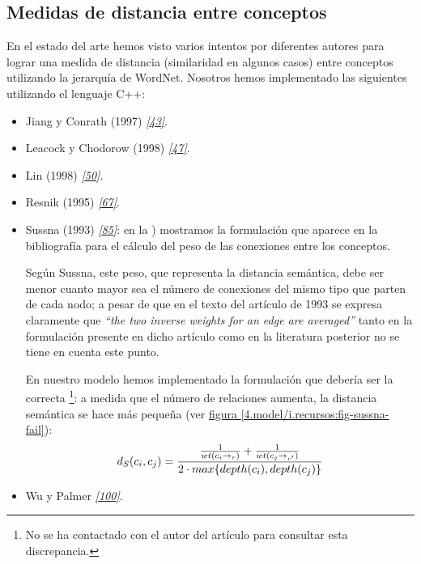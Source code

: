 \documentclass[a4paper,12pt,spanish]{book}
\begin{document}
\subsection{Medidas de distancia entre conceptos}
\label{4.model/i.recursos:medidas-de-distancia-entre-conceptos}
En el estado del arte hemos visto varios intentos por diferentes autores para lograr una
medida de distancia (similaridad en algunos casos) entre conceptos utilizando la jerarquía de
WordNet. Nosotros hemos implementado las siguientes utilizando el lenguaje C++:
\begin{itemize}
\item {} 
Jiang y Conrath (1997) \label{4.model/i.recursos:id7}{\hyperref[zreferences:jiang1997]{\emph{{[}43{]}}}}.

\item {} 
Leacock y Chodorow (1998) \label{4.model/i.recursos:id8}{\hyperref[zreferences:leacock1998]{\emph{{[}47{]}}}}.

\item {} 
Lin (1998) \label{4.model/i.recursos:id9}{\hyperref[zreferences:lin1998]{\emph{{[}50{]}}}}.

\item {} 
Resnik (1995) \label{4.model/i.recursos:id10}{\hyperref[zreferences:resnik1995]{\emph{{[}67{]}}}}.

\item {} 
Sussna (1993) \label{4.model/i.recursos:id11}{\hyperref[zreferences:sussna1993]{\emph{{[}85{]}}}}: en la {\hyperref[1.state-of-the-art/ii.medidas-distancia:redes-conceptos-estructura]{\emph{}}})
mostramos la formulación que aparece en la bibliografía para el cálculo del peso
de las conexiones entre los conceptos.

Según Sussna, este peso, que representa la distancia semántica, debe ser menor
cuanto mayor sea el número de conexiones del mismo tipo que parten de cada nodo; a pesar
de que en el texto del artículo de 1993 se expresa claramente que \emph{``the two inverse
weights for an edge are averaged''} tanto en la formulación presente en dicho artículo
como en la literatura posterior no se tiene en cuenta este punto.

En nuestro modelo hemos implementado la formulación que debería ser la
correcta \footnote{
No se ha contactado con el autor del artículo para consultar esta discrepancia.
}: a medida que el número de relaciones aumenta, la distancia semántica se
hace más pequeña (ver \hyperref[4.model/i.recursos:fig-sussna-fail]{figura  \ref*{4.model/i.recursos:fig-sussna-fail}}):
\begin{gather}
\begin{split}d_{S}(c_i, c_j) = \frac{ \frac{1}{wt(c_i \rightarrow_r)} + \frac{1}{wt(c_j \rightarrow_{r'})} }{2 \cdot max\{depth(c_i), depth(c_j)\}}\end{split}\notag
\end{gather}
\item {} 
Wu y Palmer \label{4.model/i.recursos:id13}{\hyperref[zreferences:wu1994]{\emph{{[}100{]}}}}.


\end{itemize}
\end{document}
